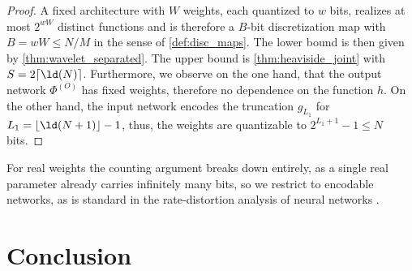 \documentclass[twoside,11pt]{article}
\begin{document}
\begin{proof}
    A fixed architecture with $W$ weights, each quantized to $w$ bits, realizes at most $2^{wW}$ distinct functions and is therefore a $B$-bit discretization map with $B = wW \le N/M$ in the sense of \cref{def:disc_maps}.
    The lower bound is then given by \cref{thm:wavelet_separated}.
    The upper bound is \cref{thm:heaviside_joint} with $S=2\lceil\ld(N)\rceil$.
    Furthermore, we observe on the one hand, that the output network $\Phi^{(O)}$ has fixed weights, therefore no dependence on the function $h$.
    On the other hand, the input network encodes the truncation $g_{L_1}$ for $L_1=\lfloor \ld(N+1)\rfloor-1$, thus, the weights are quantizable to $2^{L_1+1}-1\leq N$ bits.
\end{proof}
For real weights the counting argument breaks down entirely, as a single real parameter already carries infinitely many bits, so we restrict to encodable networks, as is standard in the rate-distortion analysis of neural networks \citep{Bolcskei19OptimalApproximationSparsely, elbrachter2021deep}.


\section{Conclusion}
\end{document}
